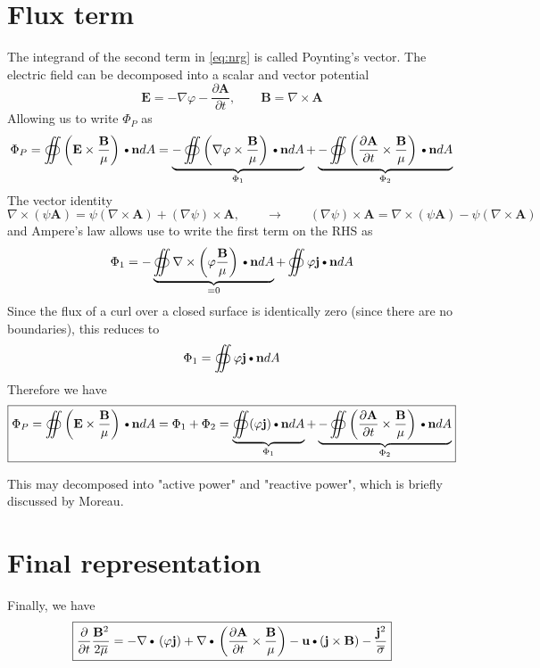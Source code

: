 \documentclass[11pt]{article}
\newcommand{\A}{\mathbf{A}}
\newcommand{\B}{\mathbf{B}}
\newcommand{\PD}{\partial}
\newcommand{\BM}{\frac{\mathbf{B}}{\mu}}
\newcommand{\J}{\mathbf{j}}
\newcommand{\E}{\mathbf{E}}
\newcommand{\N}{\mathbf{n}}
\newcommand{\U}{\mathbf{u}}
\newcommand{\MO}{\overline{\mu}}
\newcommand{\SO}{\overline{\sigma}}
\newcommand{\DOT}{\text{\textbullet}}
\begin{document}
\section{Flux term}
The integrand of the second term in \ref{eq:nrg} is called Poynting's vector. The electric field can be decomposed into a scalar and vector potential
\begin{equation}
	\E = -\nabla \varphi - \frac{\PD \A}{\PD t}, \qquad \B = \nabla \times \A
\end{equation}
Allowing us to write $\Phi_P$ as
\begin{equation}
	\Phi_P = \oiint \left( \E \times \BM \right) \DOT \N dA =
	\underbrace{- \oiint \left( \nabla \varphi \times \BM \right) \DOT \N dA}_{\Phi_1} +
	\underbrace{- \oiint \left( \frac{\PD \A}{\PD t} \times \BM \right) \DOT \N dA}_{\Phi_2}
\end{equation}
The vector identity
\begin{equation}
	\nabla \times (\psi \A) = \psi (\nabla \times \A) + (\nabla \psi) \times \A
	, \qquad \rightarrow \qquad
	(\nabla \psi) \times \A = \nabla \times (\psi \A) - \psi (\nabla \times \A)
\end{equation}
and Ampere's law allows use to write the first term on the RHS as
\begin{equation}
	\Phi_1 = - \underbrace{\oiint \nabla \times \left(\varphi \BM \right) \DOT \N dA}_{= 0}
	+ \oiint \varphi \J \DOT \N dA
\end{equation}
Since the flux of a curl over a closed surface is identically zero (since there are no boundaries), this reduces to
\begin{equation}
	\Phi_1 = \oiint \varphi \J \DOT \N dA
\end{equation}
Therefore we have
\begin{equation}
	\boxed{
	\Phi_P = \oiint \left( \E \times \BM \right) \DOT \N dA = \Phi_1 + \Phi_2 = 
	\underbrace{\oiint (\varphi \J) \DOT \N dA}_{\Phi_1} +
	\underbrace{- \oiint \left( \frac{\PD \A}{\PD t} \times \BM \right) \DOT \N dA}_{\Phi_2}
	}
\end{equation}

This may decomposed into "active power" and "reactive power", which is briefly discussed by Moreau.

\section{Final representation}
Finally, we have
\begin{equation}
	\boxed{
	\frac{\PD }{\PD t} \frac{\B^2}{2 \MO}
	=
	- \nabla \DOT \left(\varphi \J \right) 
	+ \nabla \DOT \left( \frac{\PD \A}{\PD t} \times \BM \right) 
	- \U \DOT (\J \times \B)
	- \frac{\J^2}{\SO}
	}
\end{equation}
\end{document}

